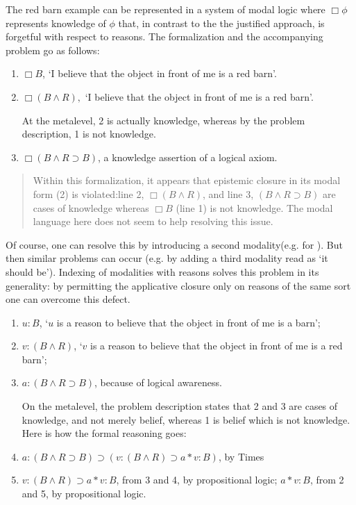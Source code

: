 The red barn example can be represented in a system of modal logic where $\Box \phi$ represents knowledge of $\phi$ that, in contrast to the the justified approach, is forgetful with respect to reasons. The formalization and the accompanying problem go as follows:

\begin{enumerate}
    \item $\Box B$, ‘I believe that the object in front of me is a red barn’.
    \item  $\Box(B \wedge R),$ ‘I believe that the object in front of me is a red barn’. 

At the metalevel, 2 is actually knowledge, whereas by the problem description, 1 is not knowledge.

   \item $\Box(B\wedge R\supset B)$, a knowledge assertion of a logical axiom.
	\end{enumerate}
\begin{quote}	
Within this formalization, it appears that epistemic closure in its modal form (2) is violated:line 2, $\Box(B \wedge R )$, and line 3, $(B \wedge R \supset B)$ are cases of knowledge whereas $\Box B$ (line 1) is not knowledge. The modal language here does not seem to help resolving this issue.
\end{quote}
Of course, one can resolve this by introducing a second modality(e.g. for ). But then similar problems can occur (e.g. by adding a third modality read as `it should be'). Indexing of modalities with reasons solves this problem in its generality: by permitting the applicative closure only on reasons of the same sort one can overcome this defect.
\begin{enumerate}
   \item $u:B$, ‘$u$ is a reason to believe that the object in front of me is a barn’;
   \item $v:(B \wedge R)$, ‘$v$ is a reason to believe that the object in front of me is a red barn’;
    \item $a:(B \wedge R \supset B)$, because of logical awareness.


 On the metalevel, the problem description states that 2 and 3 are cases of knowledge, and not merely belief, whereas 1 is belief which is not knowledge. Here is how the formal reasoning goes:

    \item $a:(B \wedge R \supset B)\supset(v:(B \wedge R) \supset  a*v:B)$, by {\sf Times} 
    \item $v:(B \wedge R) \supset a*v:B$, from 3 and 4, by propositional logic;
    $a*v:B$, from 2 and 5, by propositional logic.

\end{enumerate}

